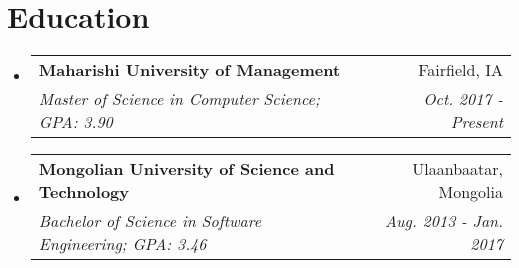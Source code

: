 \documentclass[letterpaper,11pt]{article}
\makeatletter
\newcommand{\resumeSubheading}[4]{
  \vspace{-1pt}\item
    \begin{tabular*}{0.97\textwidth}{l@{\extracolsep{\fill}}r}
      \textbf{#1} & #2 \\
      \textit{\small#3} & \textit{\small #4} \\
    \end{tabular*}\vspace{-5pt}
}
\newcommand{\resumeSubHeadingListStart}{\begin{itemize}[leftmargin=*]}
\newcommand{\resumeSubHeadingListEnd}{\end{itemize}}
\makeatother
\begin{document}
\section{Education}
  \resumeSubHeadingListStart
    \resumeSubheading
      {Maharishi University of Management}{Fairfield, IA}
      {Master of Science in Computer Science;  GPA: 3.90}{Oct. 2017 - Present}

    \resumeSubheading
      {Mongolian University of Science and Technology}{Ulaanbaatar, Mongolia}
      {Bachelor of Science in Software Engineering;  GPA: 3.46}{Aug. 2013 - Jan. 2017}
  \resumeSubHeadingListEnd


\end{document}
